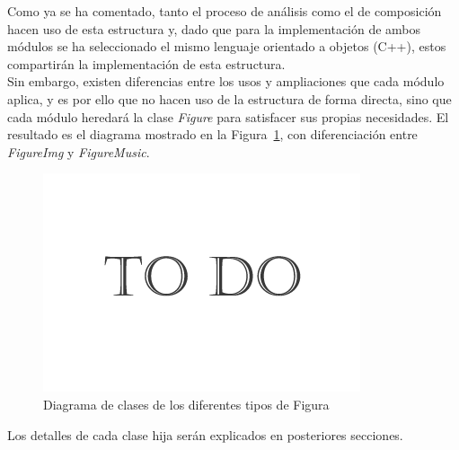 	Como ya se ha comentado, tanto el proceso de análisis como el de composición hacen uso de esta estructura y, dado que para la implementación de ambos módulos se ha seleccionado el mismo lenguaje orientado a objetos (C++), estos compartirán la implementación de esta estructura.\\
	
	Sin embargo, existen diferencias entre los usos y ampliaciones que cada módulo aplica, y es por ello que no hacen uso de la estructura de forma directa,  sino que cada módulo heredará la clase \emph{Figure} para satisfacer sus propias necesidades. El resultado es el diagrama mostrado en la Figura~\ref{fig:diagramaFigMupPhic}, con diferenciación entre \emph{FigureImg} y \emph{FigureMusic}.\\

		\begin{figure}[htbp]
		\centering
		\includegraphics[scale=0.47]{graphics/todo.png}
		\caption{Diagrama de clases de los diferentes tipos de Figura}
		\label{fig:diagramaFigMupPhic}
		\end{figure}
		
	Los detalles de cada clase hija serán explicados en posteriores secciones.	
	
